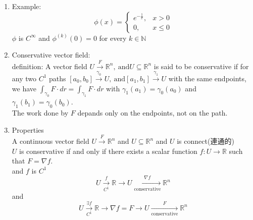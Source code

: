 \documentclass[../main.tex]{subfiles}
\begin{document}
\begin{enumerate}
\begin{figure}[H]
\end{figure}
\item Example:
\begin{equation}
\phi(x) = \begin{cases}
 e^{-\frac{1}{x}}, & x>0 \\
 0,& x\leq 0
\end{cases}
\end{equation}
$\phi$ is $C^\infty$ and $\phi^{(k)}(0) = 0$ for every $k\in \mathbb{N}$ 
\item Conservative vector field:\\
definition: A vector field $U \xrightarrow{F} \mathbb{R}^n,~\text{and} U \subseteq \mathbb{R}^n$ is said to be conservative if
for any two $C^1$ paths $[a_0,b_0]\xrightarrow{\gamma_0} U,~\text{and}[a_1,b_1]\xrightarrow{\gamma_1} U$ with the same endpoints,
we have $\int_{\gamma_0} F \cdot dr = \int_{\gamma_1} F \cdot dr$ with $\gamma_1(a_1) = \gamma_0(a_0)$ and $\gamma_1(b_1) = \gamma_0(b_0)$.\\
The work done by $F$ depands only on the endpoints, not on the path.
\item Properties\\
A continuous vector field $U \xrightarrow{F} \mathbb{R}^n$ and $U \subseteq \mathbb{R}^n$ and $U$ is connect(連通的)\\
$U$ is conservative if and only if there exists a scalar function $f: U \to \mathbb{R}$ such that $F = \nabla f$.\\
and $f$ is $C^1$
\begin{equation}
  U \xrightarrow[C^1]{f} \mathbb{R} \to U \xrightarrow[\text{conservative}]{\nabla f} \mathbb{R}^n
\end{equation}
and
\begin{equation}
  U \xrightarrow[C^1]{\exists f} \mathbb{R} \to \nabla f = F \to U \xrightarrow[\text{conservative}]{F} \mathbb{R}^n

\end{equation}
\end{enumerate}
\end{document}
